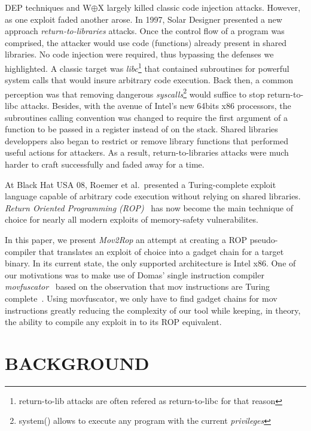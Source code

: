\documentclass[10pt,twocolumn]{article}
\begin{document}
DEP techniques and W$\oplus$X largely killed classic code injection attacks.
However, as one exploit faded another arose. In 1997, Solar Designer presented
a new approach \textit{return-to-libraries}\cite{solar_returnintolib_1997}
attacks. Once the control flow of a program was comprised, the attacker would
use code (functions) already present in shared libraries. No code injection
were required, thus bypassing the defenses we highlighted. A classic target was
\textit{libc}\footnote{return-to-lib attacks are often refered as
return-to-libc for that reason} that contained subroutines for powerful
system calls that would insure arbitrary code execution. Back then, a
common perception was that removing dangerous
\textit{syscalls}\footnote{system() allows to execute any program with the
current \textit{privileges}} would suffice to stop return-to-libc attacks.
Besides, with the avenue of Intel's new 64bits x86 processors, the
subroutines calling convention was changed to require the first argument of
a function to be passed in a register instead of on the stack. Shared
libraries developpers also began to restrict or remove library functions
that performed useful actions for attackers. As a result,
return-to-libraries attacks were much harder to craft successfully and
faded away for a time.

At Black Hat USA 08, Roemer et al.\  presented a Turing-complete exploit
language capable of arbitrary code execution without relying on shared
libraries. \textit{Return Oriented Programming
(ROP)}~\cite{roemer_return-oriented_2012} has now become the main technique of
choice for nearly all modern exploits of memory-safety vulnerabilites.

In this paper, we present \textit{Mov2Rop} an attempt at creating a ROP
pseudo-compiler that translates an exploit of choice into a gadget chain for a
target binary. In its current state, the only supported architecture is Intel
x86. One of our motivations was to make use of Domas' single instruction
compiler \textit{movfuscator}~\cite{domas_movfuscator} based on the observation
that mov instructions are Turing complete~\cite{dolan_mov_2013}. Using
movfuscator, we only have to find gadget chains for mov instructions greatly
reducing the complexity of our tool while keeping, in theory, the ability to
compile any exploit in to its ROP equivalent.


\section{BACKGROUND}
\end{document}
